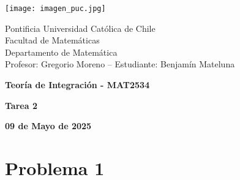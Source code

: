 \documentclass{article}
\begin{document}
\begin{minipage}{2.5cm}
    \texttt{[image: imagen\_puc.jpg]}
\end{minipage}
\begin{minipage}{14cm}
    {\sc Pontificia Universidad Católica de Chile\\
    Facultad de Matemáticas\\
    Departamento de Matemática\\
    Profesor: Gregorio Moreno -- Estudiante: Benjamín Mateluna}
\end{minipage}
\vspace{1ex}

{\centerline{\bf Teoría de Integración - MAT2534}
\centerline{\bf Tarea 2}}
\centerline{\bf 09 de Mayo de 2025}

\section*{Problema 1}
\end{document}
